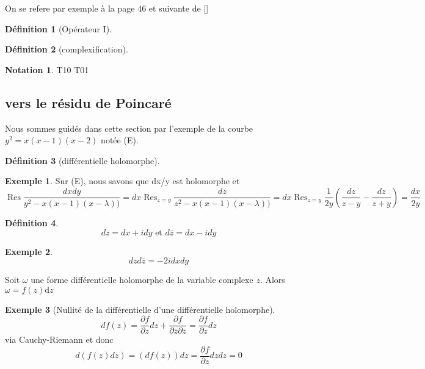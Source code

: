 \documentclass{article}
\theoremstyle{definition} %
\newtheorem{defi}{Définition}
\newtheorem{ex}{Exemple}
\newtheorem{nota}{Notation}
\newcommand{\derp}[2]{\frac{\partial {#1}}{\partial {#2}}}
\newcommand{\dd}{ \mathrm{d}}
\newcommand{\1}{\mathbb{1}} %
\begin{document}
On se refere par exemple à la page 46 et suivante de []


\begin{defi}[Opérateur I]

\end{defi}

\begin{defi}[complexification]

\end{defi}

\begin{nota}
T10 T01
\end{nota}


\subsection{vers le résidu de Poincaré}
Nous sommes guidés dans cette section par l'exemple de la courbe $y^2= x(x-1)(x-2)$ notée (E).

\begin{defi}[différentielle holomorphe]

\end{defi}

\begin{ex}
Sur (E), nous savons que dx/y est holomorphe et
$$\mathop{Res}\frac{dxdy}{y^2-x(x-1)(x-\lambda))}=dx\mathop{Res}_{z=y}\frac{dz}{z^2-x(x-1)(x-\lambda))}=dx\mathop{Res}_{z=y}\frac{1}{2y}\left(\frac{dz}{z-y}-\frac{dz}{z+y}\right)=\frac{dx}{2y}$$

\end{ex}

\begin{defi}
$$dz=dx + i dy \text{ et } d \overline{z}= dx - i dy$$
\end{defi}

\begin{ex}
$$dz d\overline{z} = -2i dxdy$$
\end{ex}

\begin{tcolorbox}[colback=blue!5!white,colframe=blue!75!black,title=Unicité de la différentielle holomorphe]
Soit $\omega$ une forme différentielle holomorphe de la variable complexe $z$.
Alors $\omega = f(z) \dd z$
\end{tcolorbox}

\begin{ex}[Nullité de la différentielle d'une différentielle holomorphe]
$$df(z)=\derp{f}{z} dz + \derp{f}{\overline{z} \partial \overline{z}} = \derp{f}{z} dz$$ via Cauchy-Riemann et donc 
$$d(f(z)dz)=(df(z))dz= \derp{f}{z} dz dz=0$$
\end{ex}
\end{document}
